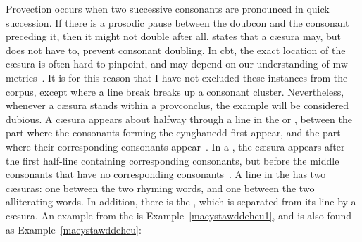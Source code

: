 Provection occurs when two successive consonants are pronounced in quick succession. If there is a prosodic pause between the \gls{doubcon} and the consonant preceding it, then it might not double after all. \Textcite[§~392]{morris-jones_cerdd_1925} states that a cæsura may, but does not have to, prevent consonant doubling. In  \gls{cbt}, the exact location of the cæsura is often hard to pinpoint, and may depend on our understanding of \gls{mw} metrics~\autocite[241]{daniel_cyfuniadau_2003}. It is for this reason that I have not excluded these instances from the corpus, except where a line break breaks up a consonant cluster. Nevertheless, whenever a cæsura stands within a \gls{provconclus}, the example will be considered dubious. A cæsura appears about halfway through a line in the  or , \ie between the part where the consonants forming the cynghanedd first appear, and the part where their corresponding consonants appear~\autocite[§~233]{morris-jones_cerdd_1925}. In a , the cæsura  appears after the first half-line containing corresponding consonants, but before the middle consonants that have no corresponding consonants~\autocite[§~255]{morris-jones_cerdd_1925}. A line in the  has two cæsuras: one between the two rhyming words, and one between the two alliterating words. In addition, there is the , which is separated from its line by a cæsura.
%   
%   
%   
%   
An example from the  is Example~\ref{maeystawddeheu1}, and is also found as Example~\ref{maeystawddeheu}: %
